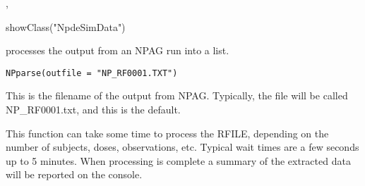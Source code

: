 \documentclass[a4paper]{book}
\begin{document}
%
\begin{SeeAlso}\relax
{}, 
\end{SeeAlso}
%
\begin{Examples}
\begin{ExampleCode}

showClass("NpdeSimData")

\end{ExampleCode}
\end{Examples}
%
\begin{Description}\relax
{} processes the output from an NPAG run into a list.
\end{Description}
%
\begin{Usage}
\begin{verbatim}
NPparse(outfile = "NP_RF0001.TXT")
\end{verbatim}
\end{Usage}
%
\begin{Arguments}
\begin{ldescription}
\item[\code{outfile}] This is the filename of the output from NPAG. Typically,
the file will be called NP\_RF0001.txt, and this is the default.
\end{ldescription}
\end{Arguments}
%
\begin{Details}\relax
This function can take some time to process the RFILE, depending on the number of subjects,
doses, observations, etc.  Typical wait times are a few seconds up to 5 minutes.
When processing is complete a summary of the extracted data will be reported on the console.
\end{Details}
%
\end{document}

